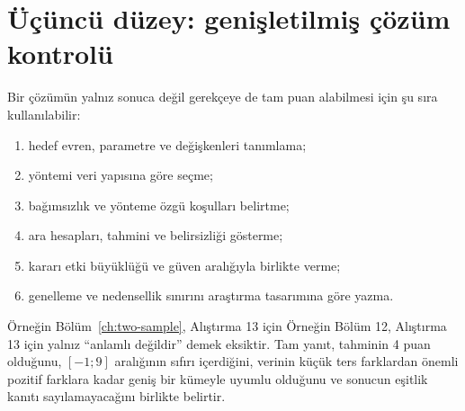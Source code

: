 \section*{Üçüncü düzey: genişletilmiş çözüm kontrolü}

Bir çözümün yalnız sonuca değil gerekçeye de tam puan alabilmesi için şu sıra
kullanılabilir:
\begin{enumerate}
  \item hedef evren, parametre ve değişkenleri tanımlama;
  \item yöntemi veri yapısına göre seçme;
  \item bağımsızlık ve yönteme özgü koşulları belirtme;
  \item ara hesapları, tahmini ve belirsizliği gösterme;
  \item kararı etki büyüklüğü ve güven aralığıyla birlikte verme;
  \item genelleme ve nedensellik sınırını araştırma tasarımına göre yazma.
\end{enumerate}

\ifimoders
Örneğin Bölüm~\ref{ch:two-sample}, Alıştırma 13 için
\else
Örneğin Bölüm 12, Alıştırma 13 için
\fi yalnız ``anlamlı değildir'' demek eksiktir.
Tam yanıt, tahminin 4 puan olduğunu, $[-1;9]$ aralığının sıfırı içerdiğini,
verinin küçük ters farklardan önemli pozitif farklara kadar geniş bir kümeyle
uyumlu olduğunu ve sonucun eşitlik kanıtı sayılamayacağını birlikte belirtir.